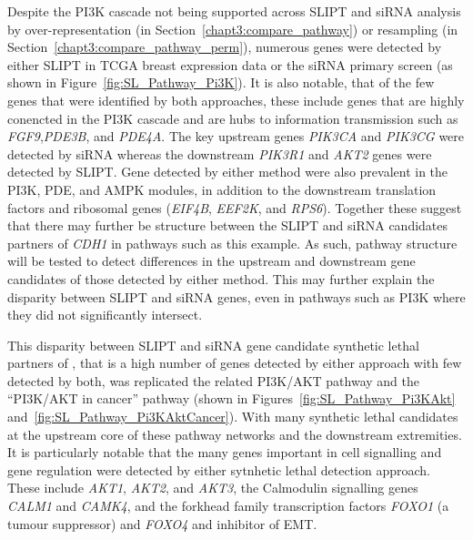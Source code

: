 Despite the \gls{PI3K} cascade not being supported across SLIPT and siRNA analysis by over-representation (in Section~\ref{chapt3:compare_pathway}) or resampling (in Section~\ref{chapt3:compare_pathway_perm}), numerous genes were detected by either \gls{SLIPT} in TCGA breast expression data or the \gls{siRNA} primary screen (as shown in Figure~\ref{fig:SL_Pathway_Pi3K}).  It is also notable, that of the few genes that were identified by both approaches, these include genes that are highly conencted in the PI3K cascade and are hubs to information transmission such as \textit{FGF9},\textit{PDE3B}, and \textit{PDE4A}. The key upstream genes \textit{PIK3CA} and \textit{PIK3CG} were detected by \gls{siRNA} whereas the downstream \textit{PIK3R1} and \textit{AKT2} genes were detected by \gls{SLIPT}. Gene detected by either method were also prevalent in the \gls{PI3K}, \gls{PDE}, and \gls{AMPK} modules, in addition to the downstream translation factors and ribosomal genes (\textit{EIF4B}, \textit{EEF2K}, and \textit{RPS6}). Together these suggest that there may further be structure between the \gls{SLIPT} and \gls{siRNA} candidates partners of \textit{CDH1} in pathways such as this example. As such, pathway structure will be tested to detect differences in the upstream and downstream gene candidates of those detected by either method. This may further explain the disparity between \gls{SLIPT} and \gls{siRNA} genes, even in pathways such as PI3K where they did not significantly intersect.

\begin{figure*}[!htp]
\begin{mdframed}
  \begin{center}
  \resizebox{0.85 \textwidth}{!}{
    \fbox{
    \texttt{[image: \{"/home/tomkelly/Downloads/Pathway\_Structure/graph\_plot\_Pi3K\_exprSL\_2".pdf]}}
   }
   }
   \end{center}
   \caption[Synthetic Lethality in the PI3K Cascade]{\small \textbf{Synthetic Lethality in the PI3K Cascade.} The Reactome PI3K Cascade pathway with synthetic lethal candidates coloured as shown in the Legend.
}
\label{fig:SL_Pathway_Pi3K}
\end{mdframed}
\end{figure*}

This disparity between \gls{SLIPT} and \gls{siRNA} gene candidate synthetic lethal partners of , that is a high number of genes detected by either approach with few detected by both, was replicated the related PI3K/AKT pathway and the ``PI3K/AKT in cancer'' pathway (shown in Figures~\ref{fig:SL_Pathway_Pi3KAkt} and~\ref{fig:SL_Pathway_Pi3KAktCancer}). With many synthetic lethal candidates at the upstream core of these pathway networks and the downstream extremities. It is particularly notable that the many genes important in cell signalling and gene regulation were detected by either sytnhetic lethal detection approach. These include \textit{AKT1}, \textit{AKT2}, and \textit{AKT3}, the Calmodulin signalling genes \textit{CALM1} and \textit{CAMK4}, and the forkhead family transcription factors \textit{FOXO1} (a tumour suppressor) and \textit{FOXO4} and inhibitor of \gls{EMT}.


